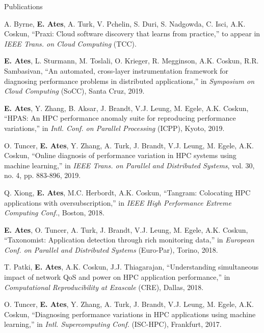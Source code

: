 \documentclass{resume}
\begin{document}
\begin{rSection}{Publications} \itemsep -3pt
\item A. Byrne, \textbf{E. Ates}, A. Turk, V. Pchelin, S. Duri, S. Nadgowda, C.
Isci, A.K. Coskun, ``Praxi: Cloud software discovery that learns from
practice,'' to appear in \textit{IEEE Trans. on Cloud Computing} (TCC).

\item \textbf{E. Ates}, L. Sturmann, M. Toslali, O. Krieger, R. Megginson, A.K.
Coskun, R.R. Sambasivan, ``An automated, cross-layer instrumentation framework
for diagnosing performance problems in distributed applications,'' in
\textit{Symposium on Cloud Computing} (SoCC), Santa Cruz, 2019.

\item \textbf{E. Ates}, Y. Zhang, B. Aksar, J. Brandt, V.J. Leung, M.
Egele, A.K. Coskun, ``HPAS: An HPC performance anomaly suite for reproducing
performance variations,'' in \textit{Intl. Conf. on Parallel Processing}
(ICPP), Kyoto, 2019.

\item O. Tuncer, \textbf{E. Ates}, Y. Zhang, A. Turk, J. Brandt, V.J. Leung, M.
Egele, A.K. Coskun, ``Online diagnosis of performance variation in HPC systems
using machine learning,'' in \textit{IEEE Trans. on Parallel and
  Distributed Systems}, vol. 30, no. 4, pp. 883-896, 2019.

\item Q. Xiong, \textbf{E. Ates}, M.C. Herbordt, A.K. Coskun, ``Tangram: Colocating
HPC applications with oversubscription,'' in \textit{IEEE High Performance
  Extreme Computing Conf.}, Boston, 2018.

\item \textbf{E. Ates}, O. Tuncer, A. Turk, J. Brandt, V.J. Leung, M. Egele, A.K.
Coskun, ``Taxonomist: Application detection through rich monitoring data,'' in
\textit{European Conf. on Parallel and Distributed Systems} (Euro-Par),
Torino, 2018.

\item T. Patki, \textbf{E. Ates}, A.K. Coskun, J.J. Thiagarajan, ``Understanding
simultaneous impact of network QoS and power on HPC application performance,''
in \textit{Computational Reproducibility at Exascale} (CRE), Dallas, 2018.

\item O. Tuncer, \textbf{E. Ates}, Y. Zhang, A. Turk, J. Brandt, V.J. Leung, M.
Egele, A.K. Coskun, ``Diagnosing performance variations in HPC applications
using machine learning,'' in \textit{Intl. Supercomputing Conf.} (ISC-HPC),
Frankfurt, 2017.

\end{rSection}
\end{document}
